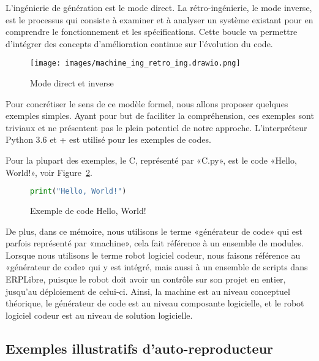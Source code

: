 L’ingénierie de génération est le mode direct. La rétro-ingénierie, le mode inverse, est le processus qui consiste à examiner et à analyser un système existant pour en comprendre le fonctionnement et les spécifications. Cette boucle va permettre d’intégrer des concepts d’amélioration continue sur l’évolution du code.

\begin{figure}[htb]
\centering
\texttt{[image: images/machine\_ing\_retro\_ing.drawio.png]}
\caption{Mode direct et inverse}
\label{fig:mode_direct_inverse}
\end{figure}

Pour concrétiser le sens de ce modèle formel, nous allons proposer quelques exemples simples. Ayant pour but de faciliter la compréhension, ces exemples sont triviaux et ne présentent pas le plein potentiel de notre approche. L’interpréteur Python 3.6 et + est utilisé pour les exemples de codes.

Pour la plupart des exemples, le C, représenté par «C.py», est le code «Hello, World!», voir Figure~\ref{fig:exemple_code_hello_world}.

\begin{figure}
\begin{lstlisting}[language=Python]
print("Hello, World!")
\end{lstlisting}
\caption{Exemple de code Hello, World!}
\label{fig:exemple_code_hello_world}
\end{figure}

De plus, dans ce mémoire, nous utilisons le terme «générateur de code» qui est parfois représenté par «machine», cela fait référence à un ensemble de modules. Lorsque nous utilisons le terme robot logiciel codeur, nous faisons référence au «générateur de code» qui y est intégré, mais aussi à un ensemble de scripts dans ERPLibre, puisque le robot doit avoir un contrôle sur son projet en entier, jusqu'au déploiement de celui-ci. Ainsi, la machine est au niveau conceptuel théorique, le générateur de code est au niveau composante logicielle, et le robot logiciel codeur est au niveau de solution logicielle.

\subsection{Exemples illustratifs d’auto-reproducteur}\label{exemple_illustratif_auto_reproducteur}

